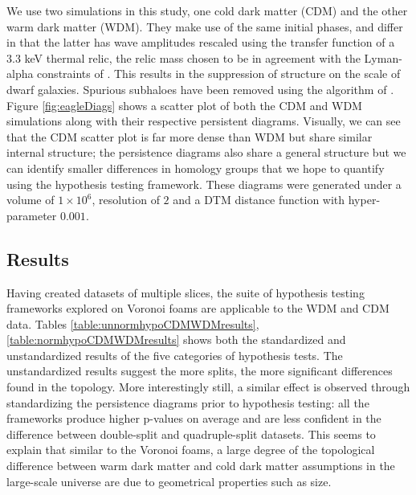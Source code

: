 \documentclass[12pt]{article}
\begin{document}
We use two simulations in this study, one cold dark matter (CDM) and the other warm dark matter (WDM). They make use of the same initial phases, and differ in that the latter has wave amplitudes rescaled using the transfer function of a $3.3$ keV thermal relic, the relic mass chosen to be in agreement with the Lyman-alpha constraints of \cite{viel2013warm}. This results in the suppression of structure on the scale of dwarf galaxies. Spurious subhaloes have been removed using the algorithm of \cite{lovell2014properties}. Figure \ref{fig:eagleDiags} shows a scatter plot of both the CDM and WDM simulations along with their respective persistent diagrams. Visually, we can see that the CDM scatter plot is far more dense than WDM but share similar internal structure; the persistence diagrams also share a general structure but we can identify smaller differences in homology groups that we hope to quantify using the hypothesis testing framework. These diagrams were generated under a volume of $1\times 10^{6}$, resolution of $2$ and a DTM distance function with hyper-parameter $0.001$. 

\subsection{Results}
Having created datasets of multiple slices, the suite of hypothesis testing frameworks explored on Voronoi foams are applicable to the WDM and CDM data. Tables \ref{table:unnormhypoCDMWDMresults}, \ref{table:normhypoCDMWDMresults} shows both the standardized and unstandardized results of the five categories of hypothesis tests. The unstandardized results suggest the more splits, the more significant differences found in the topology. More interestingly still, a similar effect is observed through standardizing the persistence diagrams prior to hypothesis testing: all the frameworks produce higher p-values on average and are less confident in the difference between double-split and quadruple-split datasets. This seems to explain that similar to the Voronoi foams, a large degree of the topological difference between warm dark matter and cold dark matter assumptions in the large-scale universe are due to geometrical properties such as size.  
\end{document}
